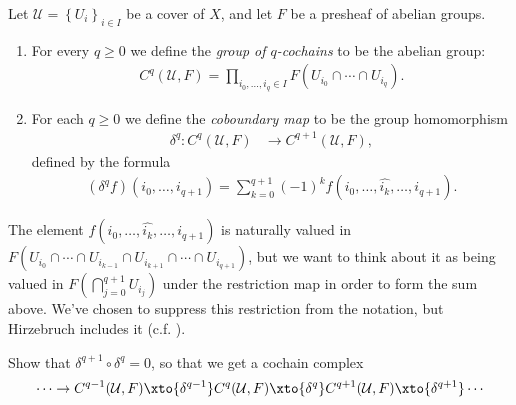 \documentclass[11pt]{book}
\begin{document}
\begin{definition}\label{def:cech-cochains-differential} Let $\mathcal{U} = \left\{ U_i \right\}_{i\in I}$ be a cover of $X$, and let $F$ be a presheaf of abelian groups.
\begin{enumerate}
    \item For every $q\ge0$ we define the \emph{group of $q$-cochains} to be the abelian group:
\begin{equation}\label{eqn:group-of-Cech-cochains}
\begin{aligned}
    C^q(\mathcal{U},F) = \prod_{i_0, \ldots, i_q \in I} F(U_{i_0} \cap \cdots \cap U_{i_q}).
\end{aligned}
\end{equation}
    \item For each $q\ge 0$ we define the \emph{coboundary map} to be the group homomorphism
\begin{equation}\label{eqn:cech-coboundary-formula}
\begin{aligned}
    \delta^q \colon C^q(\mathcal{U},F) &\to C^{q+1}(\mathcal{U},F),
\end{aligned}
\end{equation}
defined by the formula
\begin{align*}
    (\delta^q f)(i_0, \ldots, i_{q+1}) = \sum_{k=0}^{q+1} (-1)^k f(i_0, \ldots, \widehat{i_k}, \ldots, i_{q+1}).
\end{align*}
\end{enumerate}
\end{definition}

The element $f(i_0, \ldots, \widehat{i_k}, \ldots, i_{q+1})$ is naturally valued in $F(U_{i_0}\cap \cdots \cap U_{i_{k-1}} \cap U_{i_{k+1}}\cap \cdots \cap U_{i_{q+1}})$, but we want to think about it as being valued in $F(\bigcap_{j=0}^{q+1} U_{i_j})$ under the restriction map in order to form the sum above. We've chosen to suppress this restriction from the notation, but Hirzebruch includes it (c.f. \cite[p.~26]{Hirzebruch}).
%
\begin{exercise} Show that $\delta^{q+1}\circ \delta^q = 0$, so that we get a cochain complex
\begin{equation}\label{eqn:Cech-cochain-complex}
\begin{aligned}
     \cdots \to C^{q-1}(\mathcal{U},F) \xto{\delta^{q-1}} C^q(\mathcal{U},F) \xto{\delta^q} C^{q+1}(\mathcal{U},F) \xto{\delta^{q+1}} \cdots
\end{aligned}
\end{equation}
\end{exercise}
\end{document}
